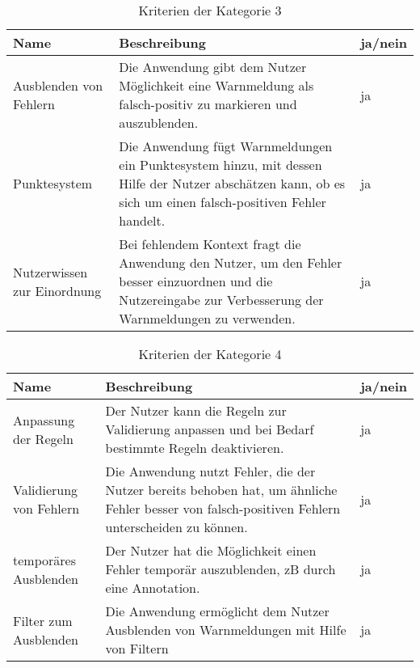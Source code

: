 \begin{table}[htp]
    \centering
    \begin{tabularx}{\columnwidth}{lXl}
        \toprule
        \textbf{Name}               & \textbf{Beschreibung}                                                                                                                                         & \textbf{ja/nein} \\
        \midrule
        Ausblenden von Fehlern      & Die Anwendung gibt dem Nutzer Möglichkeit eine Warnmeldung als falsch-positiv zu markieren und auszublenden.                                                  & ja               \\
        \midrule
        Punktesystem                & Die Anwendung fügt Warnmeldungen ein Punktesystem hinzu, mit dessen Hilfe der Nutzer abschätzen kann, ob es sich um einen falsch-positiven Fehler handelt.    & ja               \\
        \midrule
        Nutzerwissen zur Einordnung & Bei fehlendem Kontext fragt die Anwendung den Nutzer, um den Fehler besser einzuordnen und die Nutzereingabe zur Verbesserung der Warnmeldungen zu verwenden. & ja               \\
        \bottomrule
    \end{tabularx}
    \caption{Kriterien der Kategorie 3}
    \label{tbl:criteria-category-3}
\end{table}


\begin{table}[htp]
    \centering
    \begin{tabularx}{\columnwidth}{lXl}
        \toprule
        \textbf{Name}           & \textbf{Beschreibung}                                                                                                                           & \textbf{ja/nein} \\
        \midrule
        Anpassung der Regeln    & Der Nutzer kann die Regeln zur Validierung anpassen und bei Bedarf bestimmte Regeln deaktivieren.                                               & ja               \\
        \midrule
        Validierung von Fehlern & Die Anwendung nutzt Fehler, die der Nutzer bereits behoben hat, um ähnliche Fehler besser von falsch-positiven Fehlern unterscheiden zu können. & ja               \\
        \midrule
        temporäres Ausblenden   & Der Nutzer hat die Möglichkeit einen Fehler temporär auszublenden, \ac{zB} durch eine Annotation.                                               & ja               \\
        \midrule
        Filter zum Ausblenden   & Die Anwendung ermöglicht dem Nutzer Ausblenden von Warnmeldungen mit Hilfe von Filtern                                                          & ja               \\
        \bottomrule
    \end{tabularx}
    \caption{Kriterien der Kategorie 4}
    \label{tbl:criteria-category-4}
\end{table}

